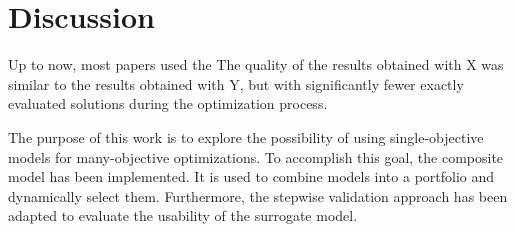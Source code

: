 







\section{Discussion}

Up to now, most papers used the The quality of the results obtained with X was similar to the results obtained with Y, but with significantly fewer exactly evaluated solutions during the optimization process. 




The purpose of this work is to explore the possibility of using single-objective models for many-objective optimizations. To accomplish this goal, the composite model has been implemented. It is used to combine models into a portfolio and dynamically select them. Furthermore, the stepwise validation approach has been adapted to evaluate the usability of the surrogate model.










